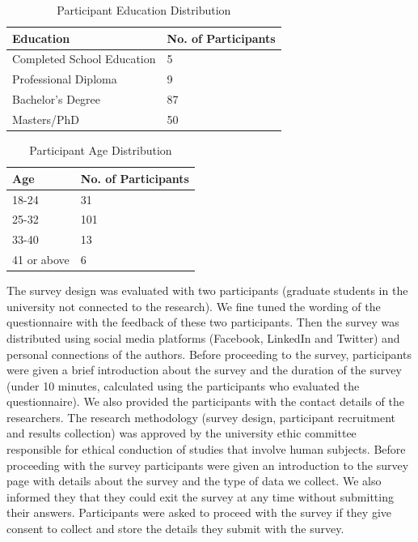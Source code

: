 \documentclass[conference]{IEEEtran}
\begin{document}
\begin{center}
\begin{table}[htbp]
\caption{Participant Education Distribution}
\begin{center}

\begin{tabular}{|l|l|} 
\hline
Education & No. of Participants \\
\hline
Completed School Education & 5 \\
\hline
Professional Diploma & 9 \\
\hline
Bachelor's Degree & 87 \\
\hline
Masters/PhD & 50 \\
\hline
\end{tabular}
\end{center}
\end{table}
\end{center} 

\begin{center}
\begin{table}[htbp]
\caption{Participant Age Distribution}
\begin{center}
\begin{tabular}{|l|l|} 
\hline
Age & No. of Participants \\
\hline
18-24  & 31 \\
\hline
25-32 & 101 \\
\hline
33-40& 13 \\
\hline
41 or above & 6\\
\hline
\end{tabular}
\end{center}
\end{table}
\end{center} 

The survey design was evaluated with two participants (graduate students in the university not connected to the research). We fine tuned the wording of the questionnaire with the feedback of these two participants. Then the survey was distributed using social media platforms (Facebook, LinkedIn and Twitter) and personal connections of the authors. Before proceeding to the survey, participants were given a brief introduction about the survey and the duration of the survey (under 10 minutes, calculated using the participants who evaluated the questionnaire). We also provided the participants with the contact details of the researchers. The research methodology (survey design, participant recruitment and results collection) was approved by the university ethic committee responsible for ethical conduction of studies that involve human subjects. Before proceeding with the survey participants were given an introduction to the survey page with details about the survey and the type of data we collect. We also informed they that they could exit the survey at any time without submitting their answers. Participants were asked to proceed with the survey if they give consent to collect and store the details they submit with the survey.
\end{document}
